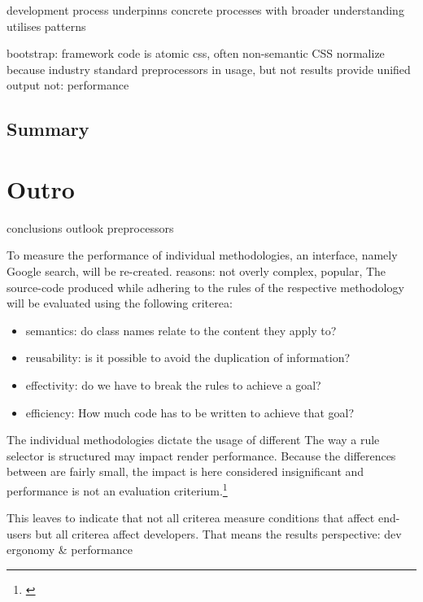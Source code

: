 development process underpinns concrete processes with broader understanding
utilises patterns


bootstrap: framework code is atomic css, often non-semantic
CSS normalize because industry standard
preprocessors in usage, but not results
provide unified output
not: performance
\section{Summary}
% 


\chapter{Outro}
conclusions
outlook
preprocessors

To measure the performance of individual methodologies, an interface, namely Google search, will be re-created.
reasons: not overly complex, popular, 
The source-code produced while adhering to the rules of the respective methodology will be evaluated using the following criterea:
\begin{itemize}
    \item semantics: do class names relate to the content they apply to?
    \item reusability: is it possible to avoid the duplication of information?
    \item effectivity: do we have to break the rules to achieve a goal?
    \item efficiency: How much code has to be written to achieve that goal?
\end{itemize}


The individual methodologies dictate the usage of different 
The way a rule selector is structured may impact render performance. 
Because the differences between are fairly small, the impact is here considered insignificant and performance is not an evaluation criterium.\footnote{\cite{selectorperformance}}

This leaves to indicate that not all criterea measure conditions that affect end-users but all criterea affect developers.
That means the results
perspective:
dev ergonomy \& performance
%  

